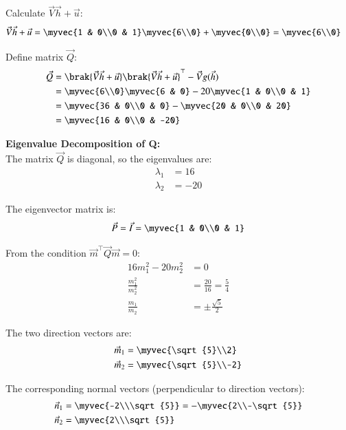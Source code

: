 \documentclass[article]{IEEEtran}
\begin{document}
	Calculate $\vec{V}\vec{h} + \vec{u}$:
	\begin{align}
		\vec{V}\vec{h} + \vec{u} &= \myvec{1 & 0\\0 & 1}\myvec{6\\0} + \myvec{0\\0} = \myvec{6\\0}
	\end{align}
	
	Define matrix $\vec{Q}$:
	\begin{align}
		\vec{Q} &= \brak{\vec{V}\vec{h} + \vec{u}}\brak{\vec{V}\vec{h} + \vec{u}}^\top - \vec{V}g(\vec{h})\\
		&= \myvec{6\\0}\myvec{6 & 0} - 20\myvec{1 & 0\\0 & 1}\\
		&= \myvec{36 & 0\\0 & 0} - \myvec{20 & 0\\0 & 20}\\
		&= \myvec{16 & 0\\0 & -20}
	\end{align}
	
	\textbf{Eigenvalue Decomposition of Q:}\\
	The matrix $\vec{Q}$ is diagonal, so the eigenvalues are:
	\begin{align}
		\lambda_1 &= 16\\
		\lambda_2 &= -20
	\end{align}
	
	The eigenvector matrix is:
	\begin{align}
		\vec{P} = \vec{I} = \myvec{1 & 0\\0 & 1}
	\end{align}
	
	From the condition $\vec{m}^\top\vec{Q}\vec{m} = 0$:
	\begin{align}
		16m_1^2 - 20m_2^2 &= 0\\
		\frac{m_1^2}{m_2^2} &= \frac{20}{16} = \frac{5}{4}\\
		\frac{m_1}{m_2} &= \pm\frac{\sqrt{5}}{2}
	\end{align}
	
	The two direction vectors are:
	\begin{align}
		\vec{m}_1 &= \myvec{\sqrt{5}\\2}\\
		\vec{m}_2 &= \myvec{\sqrt{5}\\-2}
	\end{align}
	
	The corresponding normal vectors (perpendicular to direction vectors):
	\begin{align}
		\vec{n}_1 &= \myvec{-2\\\sqrt{5}} = -\myvec{2\\-\sqrt{5}}\\
		\vec{n}_2 &= \myvec{2\\\sqrt{5}}
	\end{align}
	
\end{document}
